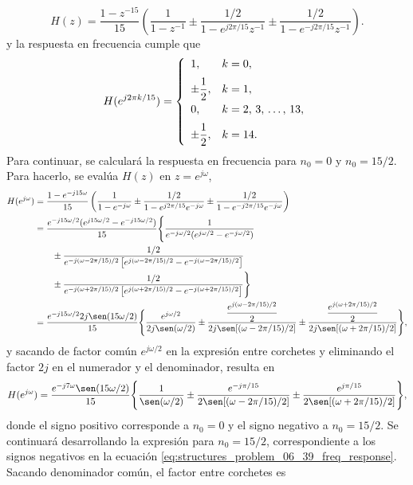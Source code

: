 \documentclass[a4paper]{report}
\begin{document}
\[
 H(z)=\dfrac{1-z^{-15}}{15}\left(\frac{1}{1-z^{-1}}\pm\frac{1/2}{1-e^{j2\pi/15}z^{-1}}
   \pm\frac{1/2}{1-e^{-j2\pi/15}z^{-1}}\right).
\]
y la respuesta en frecuencia cumple que 
\begin{equation}\label{eq:structures_problem_06_39_freq_samples}
 H(e^{j2\pi k/15})=
 \left\{ 
 \begin{array}{ll}
  1,& k=0, \\[\medskipamount]
  \pm\dfrac{1}{2}, &k=1, \\[\medskipamount]
  0, & k=2,\,3,\,\dots,\,13, \\[\medskipamount]
  \pm\dfrac{1}{2}, &k=14.
 \end{array}
 \right. 
\end{equation}
Para continuar, se calculará la respuesta en frecuencia para \(n_0=0\) y \(n_0=15/2\). Para hacerlo, se evalúa \(H(z)\) en \(z=e^{j\omega}\),
\begin{align*}
 H(e^{j\omega})&=\dfrac{1-e^{-j15\omega}}{15}\left(\frac{1}{1-e^{-j\omega}}\pm\frac{1/2}{1-e^{j2\pi/15}e^{-j\omega}}\pm\frac{1/2}{1-e^{-j2\pi/15}e^{-j\omega}}\right)\\
  &=\frac{e^{-j15\omega/2}(e^{j15\omega/2}-e^{-j15\omega/2})}{15}\Bigg\{\frac{1}{e^{-j\omega/2}(e^{j\omega/2}-e^{-j\omega/2})}\\
  &\qquad\pm\frac{1/2}{e^{-j(\omega-2\pi/15)/2}\left[e^{j(\omega-2\pi/15)/2}-e^{-j(\omega-2\pi/15)/2}\right]}\\
  &\qquad\pm\frac{1/2}{e^{-j(\omega+2\pi/15)/2}\left[e^{j(\omega+2\pi/15)/2}-e^{-j(\omega+2\pi/15)/2}\right]}\Bigg\}\\
  &=\frac{e^{-j15\omega/2}2j\sen(15\omega/2)}{15}\Bigg\{\frac{e^{j\omega/2}}{2j\sen(\omega/2)}
   \pm\dfrac{\dfrac{e^{j(\omega-2\pi/15)/2}}{2}}{2j\sen[(\omega-2\pi/15)/2]}
   \pm\dfrac{\dfrac{e^{j(\omega+2\pi/15)/2}}{2}}{2j\sen[(\omega+2\pi/15)/2]}\Bigg\},
\end{align*}
y sacando de factor común \(e^{j\omega/2}\) en la expresión entre corchetes y eliminando el factor \(2j\) en el numerador y el denominador, resulta en
\begin{equation}\label{eq:structures_problem_06_39_freq_response}
 H(e^{j\omega})=\frac{e^{-j7\omega}\sen(15\omega/2)}{15}\Bigg\{\frac{1}{\sen(\omega/2)}
   \pm\dfrac{e^{-j\pi/15}}{2\sen[(\omega-2\pi/15)/2]}
   \pm\dfrac{e^{j\pi/15}}{2\sen[(\omega+2\pi/15)/2]}\Bigg\}, 
\end{equation}
donde el signo positivo corresponde a \(n_0=0\) y el signo negativo a \(n_0=15/2\). Se continuará desarrollando la expresión para \(n_0=15/2\), correspondiente a los signos negativos en la ecuación \ref{eq:structures_problem_06_39_freq_response}. Sacando denominador común, el factor entre corchetes es
\end{document}
